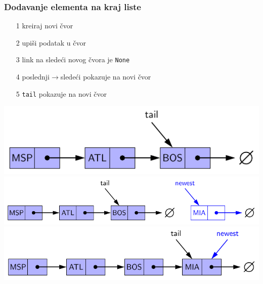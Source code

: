 \documentclass[compress]{beamer}
\begin{document}
\begin{frame}[fragile]
  \frametitle{Dodavanje elementa na kraj liste}
  \begin{itemize}
    \item[1] kreiraj novi čvor
    \item[2] upiši podatak u čvor
    \item[3] link na sledeći novog čvora je \texttt{None}
    \item[4] poslednji$\rightarrow$sledeći pokazuje na novi čvor
    \item[5] \texttt{tail} pokazuje na novi čvor
  \end{itemize}
  \begin{center}
    \includegraphics[scale=0.7]{asp-07-pic04a.pdf} \\
    \includegraphics[scale=0.7]{asp-07-pic04b.pdf} \\
    \includegraphics[scale=0.7]{asp-07-pic04c.pdf}
  \end{center}
\end{frame}
\end{document}
